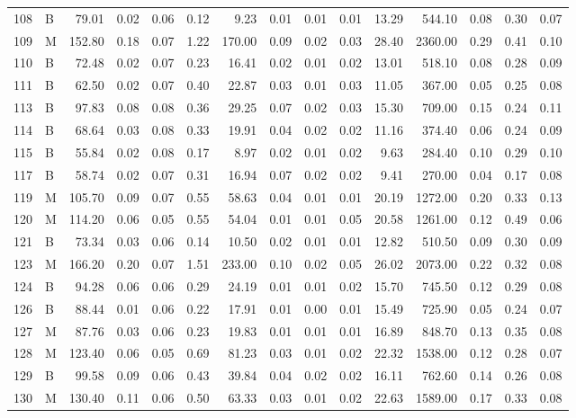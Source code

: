 \begin{table}[ht]
\begin{tabular}{rlrrrrrrrrrrrrr}
  108 & B & 79.01 & 0.02 & 0.06 & 0.12 & 9.23 & 0.01 & 0.01 & 0.01 & 13.29 & 544.10 & 0.08 & 0.30 & 0.07 \\ 
  109 & M & 152.80 & 0.18 & 0.07 & 1.22 & 170.00 & 0.09 & 0.02 & 0.03 & 28.40 & 2360.00 & 0.29 & 0.41 & 0.10 \\ 
  110 & B & 72.48 & 0.02 & 0.07 & 0.23 & 16.41 & 0.02 & 0.01 & 0.02 & 13.01 & 518.10 & 0.08 & 0.28 & 0.09 \\ 
  111 & B & 62.50 & 0.02 & 0.07 & 0.40 & 22.87 & 0.03 & 0.01 & 0.03 & 11.05 & 367.00 & 0.05 & 0.25 & 0.08 \\ 
  113 & B & 97.83 & 0.08 & 0.08 & 0.36 & 29.25 & 0.07 & 0.02 & 0.03 & 15.30 & 709.00 & 0.15 & 0.24 & 0.11 \\ 
  114 & B & 68.64 & 0.03 & 0.08 & 0.33 & 19.91 & 0.04 & 0.02 & 0.02 & 11.16 & 374.40 & 0.06 & 0.24 & 0.09 \\ 
  115 & B & 55.84 & 0.02 & 0.08 & 0.17 & 8.97 & 0.02 & 0.01 & 0.02 & 9.63 & 284.40 & 0.10 & 0.29 & 0.10 \\ 
  117 & B & 58.74 & 0.02 & 0.07 & 0.31 & 16.94 & 0.07 & 0.02 & 0.02 & 9.41 & 270.00 & 0.04 & 0.17 & 0.08 \\ 
  119 & M & 105.70 & 0.09 & 0.07 & 0.55 & 58.63 & 0.04 & 0.01 & 0.01 & 20.19 & 1272.00 & 0.20 & 0.33 & 0.13 \\ 
  120 & M & 114.20 & 0.06 & 0.05 & 0.55 & 54.04 & 0.01 & 0.01 & 0.05 & 20.58 & 1261.00 & 0.12 & 0.49 & 0.06 \\ 
  121 & B & 73.34 & 0.03 & 0.06 & 0.14 & 10.50 & 0.02 & 0.01 & 0.01 & 12.82 & 510.50 & 0.09 & 0.30 & 0.09 \\ 
  123 & M & 166.20 & 0.20 & 0.07 & 1.51 & 233.00 & 0.10 & 0.02 & 0.05 & 26.02 & 2073.00 & 0.22 & 0.32 & 0.08 \\ 
  124 & B & 94.28 & 0.06 & 0.06 & 0.29 & 24.19 & 0.01 & 0.01 & 0.02 & 15.70 & 745.50 & 0.12 & 0.29 & 0.08 \\ 
  126 & B & 88.44 & 0.01 & 0.06 & 0.22 & 17.91 & 0.01 & 0.00 & 0.01 & 15.49 & 725.90 & 0.05 & 0.24 & 0.07 \\ 
  127 & M & 87.76 & 0.03 & 0.06 & 0.23 & 19.83 & 0.01 & 0.01 & 0.01 & 16.89 & 848.70 & 0.13 & 0.35 & 0.08 \\ 
  128 & M & 123.40 & 0.06 & 0.05 & 0.69 & 81.23 & 0.03 & 0.01 & 0.02 & 22.32 & 1538.00 & 0.12 & 0.28 & 0.07 \\ 
  129 & B & 99.58 & 0.09 & 0.06 & 0.43 & 39.84 & 0.04 & 0.02 & 0.02 & 16.11 & 762.60 & 0.14 & 0.26 & 0.08 \\ 
  130 & M & 130.40 & 0.11 & 0.06 & 0.50 & 63.33 & 0.03 & 0.01 & 0.02 & 22.63 & 1589.00 & 0.17 & 0.33 & 0.08 \\ 

\end{tabular}
\end{table}
